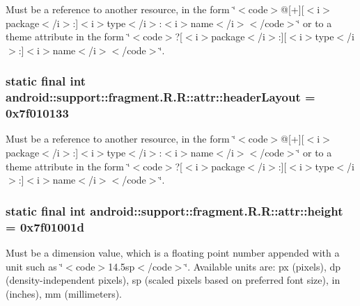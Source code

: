 Must be a reference to another resource, in the form \char`\"{}$<$code$>$@\mbox{[}+\mbox{]}\mbox{[}$<$i$>$package$<$/i$>$:\mbox{]}$<$i$>$type$<$/i$>$:$<$i$>$name$<$/i$>$$<$/code$>$\char`\"{} or to a theme attribute in the form \char`\"{}$<$code$>$?\mbox{[}$<$i$>$package$<$/i$>$:\mbox{]}\mbox{[}$<$i$>$type$<$/i$>$:\mbox{]}$<$i$>$name$<$/i$>$$<$/code$>$\char`\"{}. \hypertarget{classandroid_1_1support_1_1fragment_1_1_r_1_1attr_6f7f33db269768d7deed1d349de06b02}{
\subsubsection[{headerLayout}]{\setlength{\rightskip}{0pt plus 5cm}static final int android::support::fragment.R.R::attr::headerLayout = 0x7f010133}}
\label{classandroid_1_1support_1_1fragment_1_1_r_1_1attr_6f7f33db269768d7deed1d349de06b02}


Must be a reference to another resource, in the form \char`\"{}$<$code$>$@\mbox{[}+\mbox{]}\mbox{[}$<$i$>$package$<$/i$>$:\mbox{]}$<$i$>$type$<$/i$>$:$<$i$>$name$<$/i$>$$<$/code$>$\char`\"{} or to a theme attribute in the form \char`\"{}$<$code$>$?\mbox{[}$<$i$>$package$<$/i$>$:\mbox{]}\mbox{[}$<$i$>$type$<$/i$>$:\mbox{]}$<$i$>$name$<$/i$>$$<$/code$>$\char`\"{}. \hypertarget{classandroid_1_1support_1_1fragment_1_1_r_1_1attr_ba4454bd009fd6c9fed66fde3d473899}{
\subsubsection[{height}]{\setlength{\rightskip}{0pt plus 5cm}static final int android::support::fragment.R.R::attr::height = 0x7f01001d}}
\label{classandroid_1_1support_1_1fragment_1_1_r_1_1attr_ba4454bd009fd6c9fed66fde3d473899}


Must be a dimension value, which is a floating point number appended with a unit such as \char`\"{}$<$code$>$14.5sp$<$/code$>$\char`\"{}. Available units are: px (pixels), dp (density-independent pixels), sp (scaled pixels based on preferred font size), in (inches), mm (millimeters). 

